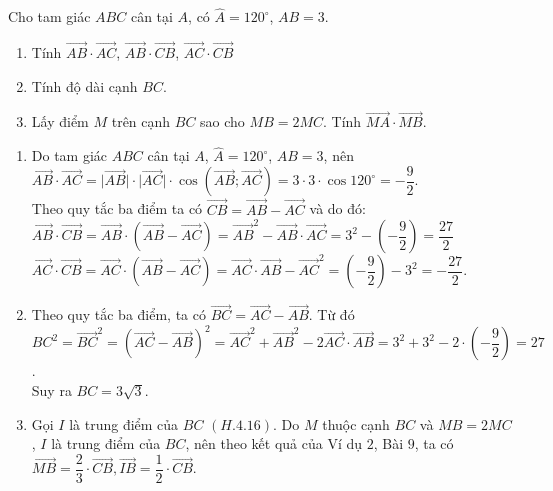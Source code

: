 \begin{bt}%
	Cho tam giác $ABC$ cân tại $A$, có $\widehat{A}=120^\circ$, $AB=3$.
	\begin{enumerate}
		\item Tính $\overrightarrow{AB}\cdot\overrightarrow{AC}$, $\overrightarrow{AB}\cdot\overrightarrow{CB}$, $\overrightarrow{AC}\cdot\overrightarrow{CB}$
		\item Tính độ dài cạnh $BC$.
		\item Lấy điểm $M$ trên cạnh $BC$ sao cho $MB=2MC$. Tính $\overrightarrow{MA}\cdot\overrightarrow{MB}$.
	\end{enumerate}
	\loigiai
	{
		\begin{enumerate}
			\item Do tam giác $ABC$ cân tại $A$, $\widehat{A}=120^\circ$, $AB=3$, nên\\
			$\overrightarrow{AB}\cdot\overrightarrow{AC}=\big|\overrightarrow{AB}\big|\cdot\big|\overrightarrow{AC}\big|\cdot\cos(\overrightarrow{AB};\overrightarrow{AC})=3\cdot 3\cdot\cos 120^{\circ}=-\dfrac{9}{2}$.\\
			Theo quy tắc ba điểm ta có $\overrightarrow{CB}=\overrightarrow{AB}-\overrightarrow{AC}$ và do đó:\\
			$\overrightarrow{AB} \cdot \overrightarrow{CB}=\overrightarrow{AB} \cdot(\overrightarrow{AB}-\overrightarrow{AC})=\overrightarrow{AB}^{2}-\overrightarrow{AB} \cdot \overrightarrow{AC}=3^{2}-\left(-\dfrac{9}{2}\right)=\dfrac{27}{2}$\\
			$\overrightarrow{AC} \cdot \overrightarrow{CB}=\overrightarrow{AC} \cdot(\overrightarrow{AB}-\overrightarrow{AC})=\overrightarrow{AC} \cdot \overrightarrow{AB}-\overrightarrow{AC}^{2}=\left(-\dfrac{9}{2}\right)-3^{2}=-\dfrac{27}{2}$.
			\item Theo quy tắc ba điểm, ta có $\overrightarrow{BC}=\overrightarrow{AC}-\overrightarrow{AB}$. Từ đó\\
			$BC^{2}=\overrightarrow{BC}^{2}=(\overrightarrow{AC}-\overrightarrow{AB})^{2}=\overrightarrow{AC}^{2}+\overrightarrow{AB}^{2}-2 \overrightarrow{AC} \cdot \overrightarrow{AB}=3^{2}+3^{2}-2 \cdot\left(-\dfrac{9}{2}\right)=27$.\\
			Suy ra $BC=3\sqrt{3}$.
			\item Gọi $I$ là trung điểm của $BC$ $(H.4.16)$. Do $M$ thuộc cạnh $BC$ và $MB=2MC$, $I$ là trung điểm của $BC$, nên theo kết quả của Ví dụ $2$, Bài $9$, ta có $\overrightarrow{MB}=\dfrac{2}{3}\cdot \overrightarrow{CB}, \overrightarrow{IB}=\dfrac{1}{2}\cdot \overrightarrow{CB}$.

\end{enumerate}}
\end{bt}
